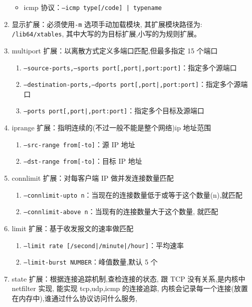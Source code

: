 \begin{enumerate}
\begin{itemize}
\begin{enumerate}
        \end{enumerate}
      \item icmp 协议：\texttt{--icmp {type[/code] | typename}}
    \end{itemize}
  \item  显示扩展：必须使用\texttt{-m} 选项手动加载模块,
    其扩展模块路径为: \texttt{/lib64/xtables},
    其中大写的为目标扩展,小写的为规则扩展。
  \item multiport 扩展：以离散方式定义多端口匹配,但最多指定 15 个端口
    \begin{enumerate}
      \item \texttt{--source-ports,--sports port[,port|,port:port]}：指定多个源端口
      \item \texttt{--destination-ports,--dports port[,port|,port:port]}：指定多个源端口
      \item \texttt{--ports port[,port|,port:port]}：指定多个目标及源端口
    \end{enumerate}
  \item iprange 扩展：指明连续的(不过一般不能是整个网络)ip 地址范围
    \begin{enumerate}
      \item \texttt{--src-range from[-to]}：源 IP 地址
      \item \texttt{--dst-range from[-to]}：目标 IP 地址
    \end{enumerate}
  \item connlimit 扩展：对每客户端 IP 做并发连接数量匹配
    \begin{enumerate}
      \item \texttt{--connlimit-upto n}：当现在的连接数量低于或等于这个数量(n),就匹配
      \item \texttt{--connlimit-above n}：当现有的连接数量大于这个数量, 就匹配
    \end{enumerate}
  \item limit 扩展：基于收发报文的速率做匹配
    \begin{enumerate}
      \item \texttt{--limit rate [/second|/minute|/hour]}：平均速率
      \item \texttt{--limit-burst NUMBER}：峰值数量,默认 5 个
    \end{enumerate}
  \item state 扩展：根据连接追踪机制,查检连接的状态,
    跟 TCP 没有关系,是内核中 netfilter 实现,
    能实现 tcp,udp,icmp 的连接追踪,
    内核会记录每一个连接(放置在内存中),谁通过什么协议访问什么服务,

\end{enumerate}
